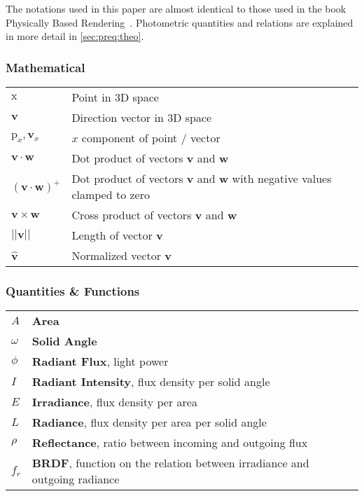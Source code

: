 \documentclass[thesis.tex]{subfiles}
\begin{document}

The notations used in this paper are almost identical to those used in the book Physically Based Rendering~\cite{bib:pbrt}. Photometric quantities and relations are explained in more detail in \autoref{sec:preq:theo}.

\subsubsection*{Mathematical}

\begin{tabular}{ l l }
$\mathrm{x}$ & Point in 3D space \\
$\mathbf{v}$ & Direction vector in 3D space \\
$\mathrm{p}_x, \mathbf{v}_x$ & $x$ component of point / vector\\
$\mathbf{v} \cdot \mathbf{w}$ & Dot product of vectors $\mathbf{v}$ and $\mathbf{w}$\\
$(\mathbf{v} \cdot \mathbf{w})^+$ & Dot product of vectors $\mathbf{v}$ and $\mathbf{w}$ with negative values clamped to zero\\
$\mathbf{v} \times \mathbf{w}$ & Cross product of vectors $\mathbf{v}$ and $\mathbf{w}$\\
$||\mathbf{v}||$ & Length of vector $\mathbf{v}$\\
$\hat{\mathbf{v}}$ & Normalized vector $\mathbf{v}$
\end{tabular}


\subsubsection*{Quantities \& Functions}

\begin{tabular}{ l l l}
$A$ & \textbf{Area}\\
$\omega$ & \textbf{Solid Angle}\\
$\phi$ & \textbf{Radiant Flux}, light power\\
$I$ & \textbf{Radiant Intensity}, flux density per solid angle\\
$E$ & \textbf{Irradiance}, flux density per area\\
$L$ & \textbf{Radiance}, flux density per area per solid angle\\
$\rho$ & \textbf{Reflectance}, ratio between incoming and outgoing flux\\
$f_r$ & \textbf{BRDF}, function on the relation between irradiance and outgoing radiance\\
\end{tabular}
\end{document}
